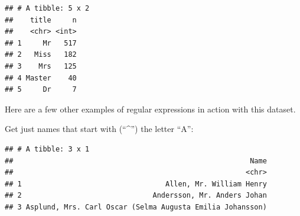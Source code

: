 \documentclass[]{book}
\makeatletter
\newenvironment{Shaded}{\begin{snugshade}}{\end{snugshade}}
\newcommand{\KeywordTok}[1]{\textcolor[rgb]{0.13,0.29,0.53}{\textbf{#1}}}
\newcommand{\DataTypeTok}[1]{\textcolor[rgb]{0.13,0.29,0.53}{#1}}
\newcommand{\DecValTok}[1]{\textcolor[rgb]{0.00,0.00,0.81}{#1}}
\newcommand{\CharTok}[1]{\textcolor[rgb]{0.31,0.60,0.02}{#1}}
\newcommand{\StringTok}[1]{\textcolor[rgb]{0.31,0.60,0.02}{#1}}
\newcommand{\OperatorTok}[1]{\textcolor[rgb]{0.81,0.36,0.00}{\textbf{#1}}}
\newcommand{\NormalTok}[1]{#1}
\newenvironment{kframe}{%
\medskip{}
\setlength{\fboxsep}{.8em}
 \def\at@end@of@kframe{}%
 \ifinner\ifhmode%
  \def\at@end@of@kframe{\end{minipage}}%
  \begin{minipage}{\columnwidth}%
 \fi\fi%
 \def\FrameCommand##1{\hskip\@totalleftmargin \hskip-\fboxsep
 \colorbox{shadecolor}{##1}\hskip-\fboxsep
     \hskip-\linewidth \hskip-\@totalleftmargin \hskip\columnwidth}%
 \MakeFramed {\advance\hsize-\width
   \@totalleftmargin\z@ \linewidth\hsize
   \@setminipage}}%
 {\par\unskip\endMakeFramed%
 \at@end@of@kframe}
\renewenvironment{Shaded}{\begin{kframe}}{\end{kframe}}
\theoremstyle{definition}
\theoremstyle{definition}
\theoremstyle{definition}
\theoremstyle{remark}
\makeatother
\begin{document}
\begin{Shaded}
\end{Shaded}

\begin{verbatim}
## # A tibble: 5 x 2
##    title     n
##    <chr> <int>
## 1     Mr   517
## 2   Miss   182
## 3    Mrs   125
## 4 Master    40
## 5     Dr     7
\end{verbatim}

Here are a few other examples of regular expressions in action with this
dataset. \bigskip

Get just names that start with (``\^{}'') the letter ``A'':

\begin{Shaded}
\end{Shaded}

\begin{verbatim}
## # A tibble: 3 x 1
##                                                        Name
##                                                       <chr>
## 1                                  Allen, Mr. William Henry
## 2                               Andersson, Mr. Anders Johan
## 3 Asplund, Mrs. Carl Oscar (Selma Augusta Emilia Johansson)
\end{verbatim}
\end{document}
